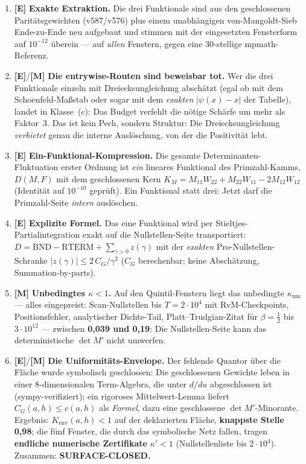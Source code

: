 \documentclass[11pt,a4paper]{article}
\newcommand{\E}{\textcolor{gut}{\textbf{[E]}}}
\newcommand{\M}{\textcolor{mess}{\textbf{[M]}}}
\begin{document}
\begin{enumerate}
\item \E{} \textbf{Exakte Extraktion.} Die drei Funktionale sind aus
      den geschlossenen Paritätsgewichten (v587/v576) plus einem
      unabhängigen von-Mangoldt-Sieb Ende-zu-Ende neu aufgebaut und
      stimmen mit der eingesetzten Fensterform auf $10^{-12}$
      überein --- auf \emph{allen} Fenstern, gegen eine
      30-stellige mpmath-Referenz.
\item \E{}/\M{} \textbf{Die entrywise-Routen sind beweisbar tot.}
      Wer die drei Funktionale einzeln mit Dreiecksungleichung
      abschätzt (egal ob mit dem Schoenfeld-Maßstab oder sogar mit
      dem \emph{exakten} $|\psi(x) - x|$ der Tabelle), landet in
      Klasse~(c): Das Budget verfehlt die nötige Schärfe um mehr als
      Faktor~3. Das ist kein Pech, sondern Struktur: Die
      Dreiecksungleichung \emph{verbietet} genau die interne
      Auslöschung, von der die Positivität lebt.
\item \E{} \textbf{Ein-Funktional-Kompression.} Die gesamte
      Determinanten-Fluktuation erster Ordnung ist \emph{ein}
      lineares Funktional des Primzahl-Kamms, $D(M, F)$ mit dem
      geschlossenen Kern $K_M = M_{11} W_{22} + M_{22} W_{11} -
      2 M_{12} W_{12}$ (Identität auf $10^{-10}$ geprüft). Ein
      Funktional statt drei: Jetzt darf die Primzahl-Seite
      \emph{intern} auslöschen.
\item \E{} \textbf{Explizite Formel.} Das eine Funktional wird per
      Stieltjes-Partialintegration exakt auf die Nullstellen-Seite
      transportiert: $D = \mathrm{BND} - \mathrm{RTERM} +
      \sum_{\gamma > 0} z(\gamma)$ mit der \emph{exakten}
      Pro-Nullstellen-Schranke $|z(\gamma)| \le 2\,C_G/\gamma^2$
      ($C_G$ berechenbar; keine Abschätzung, Summation-by-parts).
\item \M{} \textbf{Unbedingtes $\kappa < 1$.} Auf den
      Quintil-Fenstern liegt das unbedingte
      $\kappa_{\mathrm{unc}}$ --- alles eingepreist:
      Scan-Nullstellen bis $T = 2 \cdot 10^4$ mit
      RvM-Checkpoints, Positionsfehler, analytischer Dichte-Tail,
      Platt--Trudgian-Zitat für $\beta = \tfrac12$ bis
      $3 \cdot 10^{12}$ --- zwischen \textbf{0{,}039 und 0{,}19}:
      Die Nullstellen-Seite kann das deterministische $\det M'$
      nicht umwerfen.
\item \E{}/\M{} \textbf{Die Uniformitäts-Envelope.} Der fehlende
      Quantor über die Fläche wurde symbolisch geschlossen: Die
      geschlossenen Gewichte leben in einer 8-dimensionalen
      Term-Algebra, die unter $d/du$ abgeschlossen ist
      (sympy-verifiziert); ein rigoroses Mittelwert-Lemma liefert
      $C_G(a, h) \le c(a, h)$ als \emph{Formel}, dazu eine
      geschlossene $\det M'$-Minorante. Ergebnis: $K_{\mathrm{env}}
      (a, h) < 1$ auf der deklarierten Fläche, \textbf{knappste
      Stelle 0{,}98}; die fünf Fenster, die durch das symbolische
      Netz fallen, tragen \textbf{endliche numerische Zertifikate}
      $\kappa' < 1$ (Nullstellenliste bis $2 \cdot 10^4$).
      Zusammen: \textbf{SURFACE-CLOSED.}
\end{enumerate}
\end{document}
